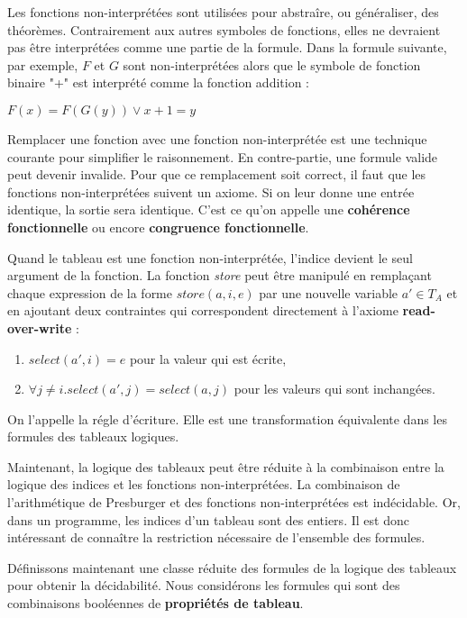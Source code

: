 \documentclass[11pt,openany]{article}
\begin{document}
	Les fonctions non-interpr\'et\'ees sont utilis\'ees pour abstra\^ire, ou g\'en\'eraliser, des th\'eor\`emes. Contrairement aux autres symboles de fonctions, elles ne devraient pas \^etre interpr\'et\'ees comme une partie de la formule. Dans la formule suivante, par exemple, $F$ et $G$ sont non-interpr\'et\'ees alors que le symbole de fonction binaire "+" est interpr\'et\'e comme la fonction addition :
	
	
$F(x) = F(G(y)) \lor x+1=y$

Remplacer une fonction avec une fonction non-interpr\'et\'ee est une technique courante pour simplifier le raisonnement.	En contre-partie, une formule valide peut devenir invalide. Pour que ce remplacement soit correct, il faut que les fonctions non-interpr\'et\'ees suivent un axiome. Si on leur donne une entr\'ee identique, la sortie sera identique. C'est ce qu'on appelle une \textbf{coh\'erence fonctionnelle} ou encore \textbf{congruence fonctionnelle}.

Quand le tableau est une fonction non-interpr\'et\'ee, l'indice devient le seul argument de la fonction. La fonction \textit{store} peut \^etre manipul\'e en rempla\c{c}ant chaque expression de la forme $store(a,i,e)$ par une nouvelle variable $a'\in T_{A}$ et en ajoutant deux contraintes qui correspondent directement \`a l'axiome \textbf{read-over-write} :

\begin{enumerate}
\item $select(a',i)=e$ pour la valeur qui est \'ecrite,
\item $\forall j\neq i. select(a',j)=select(a,j)$ pour les valeurs qui sont inchang\'ees.
\end{enumerate}	
	
On l'appelle la r\'egle d'\'ecriture. Elle est une transformation \'equivalente dans les formules des tableaux logiques.

Maintenant, la logique des tableaux peut \^etre r\'eduite \`a la combinaison entre la logique des indices et les fonctions non-interpr\'et\'ees. La combinaison de l'arithm\'etique de Presburger et des fonctions non-interpr\'et\'ees est ind\'ecidable. Or, dans un programme, les indices d'un tableau sont des entiers. Il est donc int\'eressant de conna\^itre la restriction n\'ecessaire de l'ensemble des formules.

	
	D\'efinissons maintenant une classe r\'eduite des formules de la logique des tableaux pour obtenir la d\'ecidabilit\'e. Nous consid\'erons les formules qui sont des combinaisons bool\'eennes de \textbf{propri\'et\'es de tableau}.
	
\end{document}
